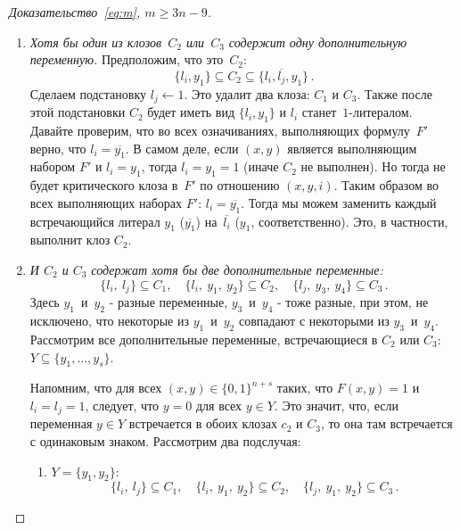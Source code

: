 \begin{proof}[Доказательство~\eqref{eq:m}, $m \ge 3n-9$]
\begin{enumerate}
		\begin{enumerate}
			\item \emph{Хотя бы один из клозов~$C_2$ или~$C_3$ содержит одну дополнительную переменную.} 
			Предположим, что это~$C_2$:
			\[\{l_i,y_1\} \subseteq C_2 \subseteq \{l_i, \overline{l_j}, y_1\}\,. \]
			Сделаем подстановку $l_j \gets 1$. Это удалит два клоза: $C_1$ и $C_3$. Также после этой подстановки $C_2$ будет иметь вид $\{l_i,y_1\}$ и $l_i$
			станет~$1$-литералом. 
			Давайте проверим, что во всех означиваниях, выполняющих формулу~$F'$ верно, что $l_i=\overline{y_1}$. 
			В самом деле, если $(x,y)$ является выполняющим набором $F'$ и $l_i=y_1$, 
			тогда $l_i=y_1=1$ (иначе $C_2$ не выполнен). 
			Но тогда не будет критического клоза в~$F'$ по отношению $(x,y,i)$. 
			Таким образом во всех выполняющих наборах $F'$: $l_i=\overline{y_1}$.
			Тогда мы можем заменить каждый встречающийся литерал $y_1$ ($\overline{y_1}$)
			на~$\overline{l_i}$ ($y_1$, соответственно).
			Это, в частности, выполнит клоз $C_2$.
			
			\item \emph{И $C_2$ и $C_3$ содержат хотя бы две дополнительные переменные:}
			\[
			\{l_i,\ l_j\} \subseteq C_1, \quad
			\{l_i,\ y_1,\ y_2\} \subseteq C_2, \quad
			\{l_j,\ y_3,\ y_4\} \subseteq C_3 \, .
			\]
			Здесь $y_1$~и~$y_2$ - разные переменные, $y_3$~и~$y_4$ - тоже разные, 
			при этом, не исключено, что некоторые из $y_1$~и~$y_2$
			совпадают с некоторыми из $y_3$~и~$y_4$. 
			Рассмотрим все дополнительные переменные, встречающиеся в $C_2$ или $C_3$:
			$Y \subseteq \{y_1, \dotsc, y_s\}$.
			
			Напомним, что для всех $(x,y) \in \{0,1\}^{n+s}$ таких, что $F(x,y)=1$ и $l_i=l_j = 1$, следует, что $y=0$ для всех $y \in Y$. 
			Это значит, что, если переменная $y \in Y$  встречается в обоих клозах $c_2$ и $C_3$, то она там встречается с одинаковым знаком.
			Рассмотрим два подслучая:
			
			\begin{enumerate}
				\item $Y=\{y_1,y_2\}$: \[\{l_i,\ l_j\} \subseteq C_1,\quad  \{l_i,\ y_1,\ y_2\} \subseteq C_2,\quad  \{l_j,\ y_1,\ y_2\} \subseteq C_3 \, .\]
				

\end{enumerate}
\end{enumerate}
\end{enumerate}
\end{proof}
